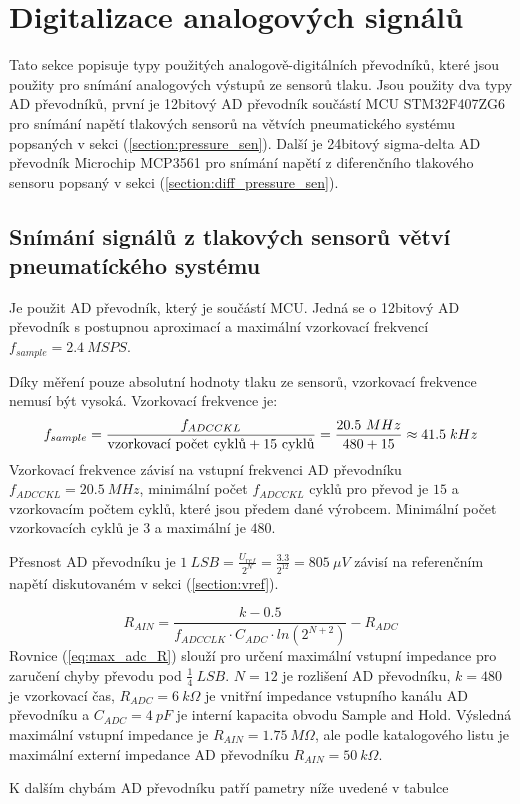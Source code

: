 \section{Digitalizace analogových signálů}
Tato sekce popisuje typy použitých analogově-digitálních převodníků, které jsou použity pro snímání analogových výstupů ze sensorů tlaku. Jsou použity dva typy AD převodníků, první je 12bitový AD převodník součástí MCU STM32F407ZG6 pro snímání napětí tlakových sensorů na větvích pneumatického systému popsaných v sekci (\ref{section:pressure_sen}).
Další je 24bitový sigma-delta AD převodník Microchip MCP3561 pro snímání napětí z diferenčního tlakového sensoru popsaný v sekci (\ref{section:diff_pressure_sen}).

\subsection{Snímání signálů z tlakových sensorů větví pneumatíckého systému}
Je použit AD převodník, který je součástí MCU. Jedná se o 12bitový AD převodník s postupnou aproximací a maximální vzorkovací frekvencí $f_{sample} = 2.4 \ MSPS$. \par
Díky měření pouze absolutní hodnoty tlaku ze sensorů, vzorkovací frekvence nemusí být vysoká. Vzorkovací frekvence je:
\begin{equation}
    f_{sample}=\frac{f_{ADCCKL}}{\textnormal{vzorkovací počet cyklů} + 15 \ \textnormal{cyklů} } = \frac{20.5 \ MHz}{480 + 15} \approx 41.5 \; kHz
\end{equation}
Vzorkovací frekvence závisí na vstupní frekvenci AD převodníku $f_{ADCCKL} = 20.5 \ MHz$, minimální počet $f_{ADCCKL} $ cyklů pro převod je $15$ a vzorkovacím počtem cyklů, které jsou předem dané výrobcem. Minimální počet vzorkovacích cyklů je $3$ a maximální je $480$.
\par
Přesnost AD převodníku je $1 \ LSB = \frac{U_{ref}}{2^N} = \frac{3.3}{2^{12}} = 805 \ \mu V$ závisí na referenčním napětí diskutovaném v sekci (\ref{section:vref}).

\begin{equation} \label{eq:max_adc_R}
    R_{AIN} = \frac{k - 0.5}{f_{ADCCLK} \cdot C_{ADC} \cdot ln(2^{N+2})} - R_{ADC}
\end{equation}
Rovnice (\ref{eq:max_adc_R}) slouží pro určení maximální vstupní impedance pro zaručení chyby převodu pod $\frac{1}{4} \ LSB$. $N = 12$ je rozlišení AD převodníku, $k = 480$ je vzorkovací čas, $R_{ADC} = 6 \ k\Omega$ je vnitřní impedance vstupního kanálu AD převodníku a
$C_{ADC} = 4 \ pF$ je interní kapacita obvodu Sample and Hold. Výsledná maximální vstupní impedance je $R_{AIN} = 1.75 \ M\Omega$, ale podle katalogového listu je maximální externí impedance AD převodníku $R_{AIN} = 50 \ k\Omega$.
\par
K dalším chybám AD převodníku patří pametry níže uvedené v tabulce

